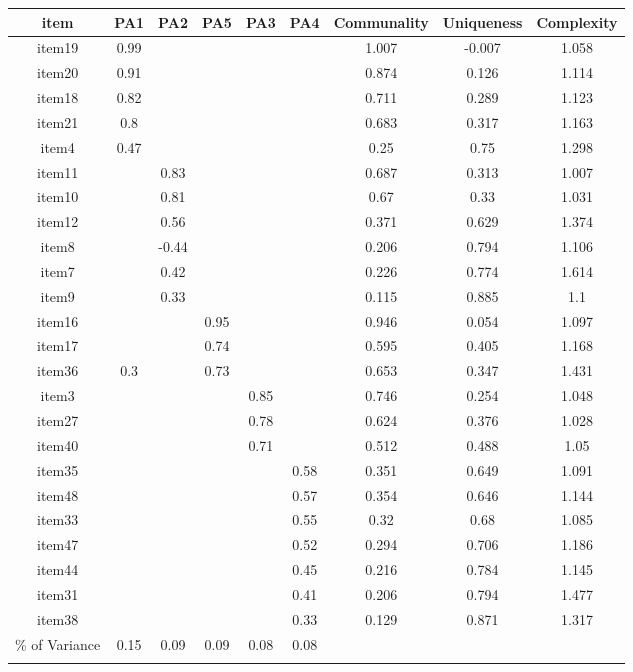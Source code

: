 \begin{appendix}
\begin{table}[h]
\begin{center}
\begin{threeparttable}
{\begin{tabular}{ccccccccc}
\toprule
item & \multicolumn{1}{c}{PA1} & \multicolumn{1}{c}{PA2} & \multicolumn{1}{c}{PA5} & \multicolumn{1}{c}{PA3} & \multicolumn{1}{c}{PA4} & \multicolumn{1}{c}{Communality} & \multicolumn{1}{c}{Uniqueness} & \multicolumn{1}{c}{Complexity}\\
\midrule
item19 & 0.99 &  &  &  &  & 1.007 & -0.007 & 1.058\\
item20 & 0.91 &  &  &  &  & 0.874 & 0.126 & 1.114\\
item18 & 0.82 &  &  &  &  & 0.711 & 0.289 & 1.123\\
item21 & 0.8 &  &  &  &  & 0.683 & 0.317 & 1.163\\
item4 & 0.47 &  &  &  &  & 0.25 & 0.75 & 1.298\\
item11 &  & 0.83 &  &  &  & 0.687 & 0.313 & 1.007\\
item10 &  & 0.81 &  &  &  & 0.67 & 0.33 & 1.031\\
item12 &  & 0.56 &  &  &  & 0.371 & 0.629 & 1.374\\
item8 &  & -0.44 &  &  &  & 0.206 & 0.794 & 1.106\\
item7 &  & 0.42 &  &  &  & 0.226 & 0.774 & 1.614\\
item9 &  & 0.33 &  &  &  & 0.115 & 0.885 & 1.1\\
item16 &  &  & 0.95 &  &  & 0.946 & 0.054 & 1.097\\
item17 &  &  & 0.74 &  &  & 0.595 & 0.405 & 1.168\\
item36 & 0.3 &  & 0.73 &  &  & 0.653 & 0.347 & 1.431\\
item3 &  &  &  & 0.85 &  & 0.746 & 0.254 & 1.048\\
item27 &  &  &  & 0.78 &  & 0.624 & 0.376 & 1.028\\
item40 &  &  &  & 0.71 &  & 0.512 & 0.488 & 1.05\\
item35 &  &  &  &  & 0.58 & 0.351 & 0.649 & 1.091\\
item48 &  &  &  &  & 0.57 & 0.354 & 0.646 & 1.144\\
item33 &  &  &  &  & 0.55 & 0.32 & 0.68 & 1.085\\
item47 &  &  &  &  & 0.52 & 0.294 & 0.706 & 1.186\\
item44 &  &  &  &  & 0.45 & 0.216 & 0.784 & 1.145\\
item31 &  &  &  &  & 0.41 & 0.206 & 0.794 & 1.477\\
item38 &  &  &  &  & 0.33 & 0.129 & 0.871 & 1.317\\
\% of Variance & 0.15 & 0.09 & 0.09 & 0.08 & 0.08 &  &  & \\
\bottomrule
\addlinespace
\end{tabular}

}
\end{threeparttable}
\end{center}
\end{table}
\end{appendix}
